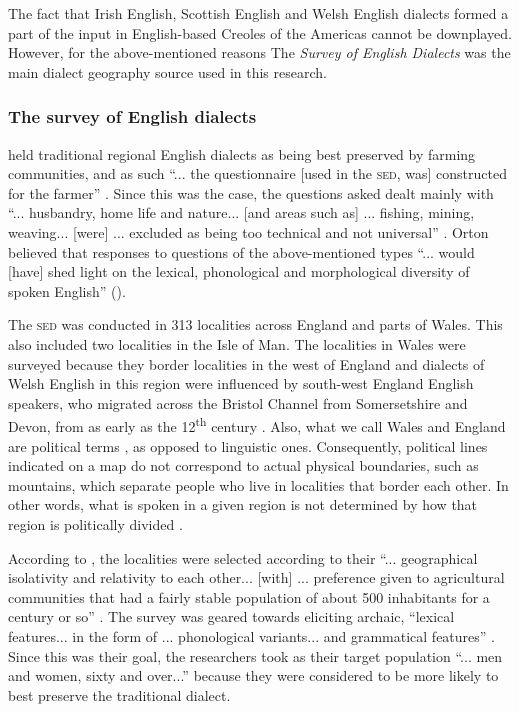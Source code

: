 The fact that Irish English, Scottish English and Welsh English dialects formed a part of the input in English-based Creoles of the Americas \citep{Mufwene01, Smith87} cannot be downplayed. However, for the above-mentioned reasons The \emph{Survey of English Dialects} was the main dialect geography source used in this research.

\subsubsection{The survey of English dialects} \label{3.2.2.1}
\citet{Orton62} held traditional regional English dialects as being best preserved by farming communities, and as such ``... the questionnaire [used in the \textsc{sed}, was] constructed for the farmer''  \citep[44]{Orton62}. Since this was the case, the questions asked dealt mainly with ``... husbandry, home life and nature... [and areas such as] ... fishing, mining, weaving... [were] ... excluded as being too technical and not universal'' \citep[44]{Orton62}. Orton believed that responses to questions of the above-mentioned types ``... would [have] shed light on the lexical, phonological and morphological diversity of spoken English'' (\citeauthor{lavc09}).

The \textsc{sed} was conducted in 313 localities across England and parts of Wales. This also included two localities in the Isle of Man. The localities in Wales were surveyed because they border localities in the west of England \citep{Orton6271} and dialects of Welsh English in this region were influenced by south-west England English speakers, who migrated across the Bristol Channel from Somersetshire and Devon, from as early as the 12\textsuperscript{th} century \citep{Penhallurick04}. Also, what we call Wales and England are political terms \citep{Nicholas72}, as opposed to linguistic ones. Consequently, political lines indicated on a map do not correspond to actual physical boundaries, such as mountains, which separate people who live in localities that border each other. In other words, what is spoken in a given region is not determined by how that region is politically divided \citep{Orton6271}.

According to \citet{Orton62}, the localities were selected according to their ``... geographical isolativity and relativity to each other... [with] ... preference given to agricultural communities that had a fairly stable population of about 500 inhabitants for a century or so'' \citep[15]{Orton62}. The survey was geared towards eliciting archaic, ``lexical features... in the form of ... phonological variants... and grammatical features'' \citep[45]{Orton62}. Since this was their goal, the researchers took as their target population ``... men and women, sixty and over...'' \citep[45]{Orton62} because they were considered to be more likely to best preserve the traditional dialect.

